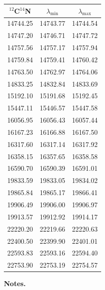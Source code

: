 \begin{table}[h!]
    \begin{center}
      \vfill
      \begin{tabular}{ccc}
        \hline
        \hline
        $^{12}$C$^{14}$N & $\lambda_{\mathrm{min}}$ & $\lambda_{\mathrm{max}}$ \\
        \hline
        14744.25 & 14743.77 & 14744.54 \\
        14747.20 & 14746.71 & 14747.72 \\
        14757.56 & 14757.17 & 14757.94 \\
        14759.84 & 14759.41 & 14760.42 \\
        14763.50 & 14762.97 & 14764.06 \\
        14833.25 & 14832.84 & 14833.69 \\
        15192.10 & 15191.68 & 15192.45 \\
        15447.11 & 15446.57 & 15447.58 \\
        16056.95 & 16056.43 & 16057.44 \\
        16167.23 & 16166.88 & 16167.50 \\
        16317.60 & 16317.14 & 16317.92 \\
        16358.15 & 16357.65 & 16358.58 \\
        16590.70 & 16590.39 & 16591.01 \\
        19833.59 & 19833.05 & 19834.02 \\
        19865.84 & 19865.17 & 19866.41 \\
        19906.49 & 19906.00 & 19906.97 \\
        19913.57 & 19912.92 & 19914.17 \\
        22220.20 & 22219.66 & 22220.63 \\
        22400.50 & 22399.90 & 22401.01 \\
        22593.83 & 22593.16 & 22594.40 \\
        22753.90 & 22753.19 & 22754.57 \\
        \hline
        \end{tabular}
      \end{center}
  
    \vspace{0.3cm}
    
    \textbf{Notes.}
    \end{table}



  